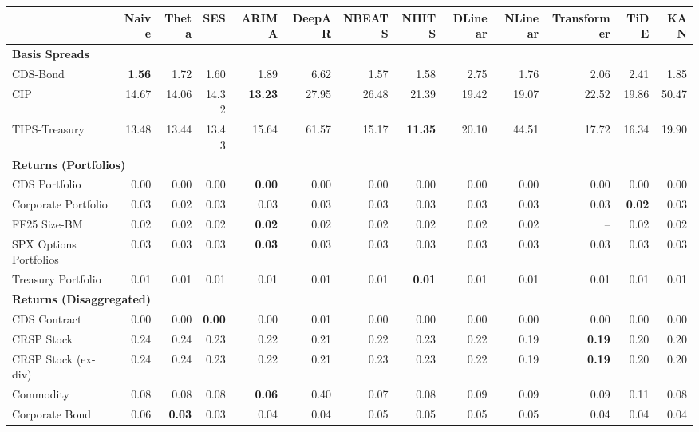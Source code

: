 \scriptsize
\setlength{\tabcolsep}{1.5pt}
\renewcommand{\arraystretch}{0.9}
\begin{tabular}{@{}lrrrrrrrrrrrr@{}}
\toprule
 & Naive & Theta & SES & ARIMA & DeepAR & NBEATS & NHITS & DLinear & NLinear & Transformer & TiDE & KAN \\
\midrule
\multicolumn{13}{l}{\textbf{Basis Spreads}} \\
CDS-Bond & \textbf{1.56} & 1.72 & 1.60 & 1.89 & 6.62 & 1.57 & 1.58 & 2.75 & 1.76 & 2.06 & 2.41 & 1.85 \\
CIP & 14.67 & 14.06 & 14.32 & \textbf{13.23} & 27.95 & 26.48 & 21.39 & 19.42 & 19.07 & 22.52 & 19.86 & 50.47 \\
TIPS-Treasury & 13.48 & 13.44 & 13.43 & 15.64 & 61.57 & 15.17 & \textbf{11.35} & 20.10 & 44.51 & 17.72 & 16.34 & 19.90 \\
\midrule
\multicolumn{13}{l}{\textbf{Returns (Portfolios)}} \\
CDS Portfolio & 0.00 & 0.00 & 0.00 & \textbf{0.00} & 0.00 & 0.00 & 0.00 & 0.00 & 0.00 & 0.00 & 0.00 & 0.00 \\
Corporate Portfolio & 0.03 & 0.02 & 0.03 & 0.03 & 0.03 & 0.03 & 0.03 & 0.03 & 0.03 & 0.03 & \textbf{0.02} & 0.03 \\
FF25 Size-BM & 0.02 & 0.02 & 0.02 & \textbf{0.02} & 0.02 & 0.02 & 0.02 & 0.02 & 0.02 & -- & 0.02 & 0.02 \\
SPX Options Portfolios & 0.03 & 0.03 & 0.03 & \textbf{0.03} & 0.03 & 0.03 & 0.03 & 0.03 & 0.03 & 0.03 & 0.03 & 0.03 \\
Treasury Portfolio & 0.01 & 0.01 & 0.01 & 0.01 & 0.01 & 0.01 & \textbf{0.01} & 0.01 & 0.01 & 0.01 & 0.01 & 0.01 \\
\midrule
\multicolumn{13}{l}{\textbf{Returns (Disaggregated)}} \\
CDS Contract & 0.00 & 0.00 & \textbf{0.00} & 0.00 & 0.01 & 0.00 & 0.00 & 0.00 & 0.00 & 0.00 & 0.00 & 0.00 \\
CRSP Stock & 0.24 & 0.24 & 0.23 & 0.22 & 0.21 & 0.22 & 0.23 & 0.22 & 0.19 & \textbf{0.19} & 0.20 & 0.20 \\
CRSP Stock (ex-div) & 0.24 & 0.24 & 0.23 & 0.22 & 0.21 & 0.23 & 0.23 & 0.22 & 0.19 & \textbf{0.19} & 0.20 & 0.20 \\
Commodity & 0.08 & 0.08 & 0.08 & \textbf{0.06} & 0.40 & 0.07 & 0.08 & 0.09 & 0.09 & 0.09 & 0.11 & 0.08 \\
Corporate Bond & 0.06 & \textbf{0.03} & 0.03 & 0.04 & 0.04 & 0.05 & 0.05 & 0.05 & 0.05 & 0.04 & 0.04 & 0.04 \\

\end{tabular}
